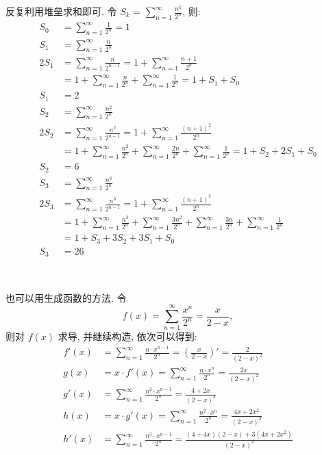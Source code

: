 \noindent 反复利用堆垒求和即可. 令 $S_k$ = $\displaystyle \sum_{n=1}^{\infty}{\frac{n^k}{2^n}}$, 则:
\begin{align*}
S_0 &= \sum_{n=1}^{\infty}{\frac{1}{2^n}} = 1 \\
S_1 &= \sum_{n=1}^{\infty}{\frac{n}{2^n}} \\
2S_1 &= \sum_{n=1}^{\infty}{\frac{n}{2^{n-1}}} = 1+\sum_{n=1}^{\infty}{\frac{n+1}{2^{n}}} \\
&= 1+\sum_{n=1}^{\infty}{\frac{n}{2^{n}}} + \sum_{n=1}^{\infty}{\frac{1}{2^{n}}} = 1 + S_1 + S_0\\
S_1 &= 2 \\
S_2 &= \sum_{n=1}^{\infty}{\frac{n^2}{2^n}} \\
2S_2 &= \sum_{n=1}^{\infty}{\frac{n^2}{2^{n-1}}} = 1 + \sum_{n=1}^{\infty}{\frac{(n+1)^2}{2^n}}\\ 
&= 1 + \sum_{n=1}^{\infty}{\frac{n^2}{2^n}} + \sum_{n=1}^{\infty}{\frac{2n}{2^n}} + \sum_{n=1}^{\infty}{\frac{1}{2^n}} = 1 + S_2 + 2S_1 + S_0 \\
S_2 &= 6 \\
S_3 &= \sum_{n=1}^{\infty}{\frac{n^3}{2^n}} \\
2S_3 &=   \sum_{n=1}^{\infty}{\frac{n^3}{2^{n-1}}} = 1 + \sum_{n=1}^{\infty}{\frac{(n+1)^3}{2^n}} \\
&= 1 +  \sum_{n=1}^{\infty}{\frac{n^3}{2^n}} +  \sum_{n=1}^{\infty}{\frac{3n^2}{2^n}} +  \sum_{n=1}^{\infty}{\frac{3n}{2^n}} +  \sum_{n=1}^{\infty}{\frac{1}{2^n}} \\
&= 1 + S_3 + 3S_2 + 3S_1 + S_0\\
S_3 &= 26
\end{align*}

~

\noindent 也可以用生成函数的方法. 令 
\[f(x) =  \sum_{n=1}^{\infty}{\frac{x^n}{2^n}} = \frac{x}{2-x} ,\]
则对 $f(x)$ 求导, 并继续构造, 依次可以得到:
\begin{align*}
f'(x) &=  \sum_{n=1}^{\infty}{\frac{n\cdot x^{n-1}}{2^n}} = \left( \frac{x}{2-x} \right)' = \frac{2}{(2-x)^2} \\
g(x) &= x\cdot f'(x) = \sum_{n=1}^{\infty}{\frac{n\cdot x^n}{2^n}} = \frac{2x}{(2-x)^2} \\
g'(x) &= \sum_{n=1}^{\infty}{\frac{n^2 \cdot x^{n-1}}{2^n}} = \frac{4+2x}{(2-x)^3} \\
h(x) &= x\cdot g'(x) = \sum_{n=1}^{\infty}{\frac{n^2\cdot x^n}{2^n}} = \frac{4x+2x^2}{(2-x)^3} \\
h'(x) &= \sum_{n=1}^{\infty}{\frac{n^3\cdot x^{n-1}}{2^n}} = \frac{(4+4x)(2-x)+3(4x+2x^2)}{(2-x)^4}
\end{align*}

